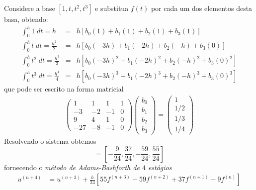 \begin{ex}
Considere a base $[1, t, t^2, t^3]$ e substitua $f(t)$ por cada um dos elementos desta basa, obtendo:
\begin{eqnarray}
  \int _0^{h} 1  \;dt = h             &=& h\left[ b_0(1)  +b_1(1)    + b_2(1)   + b_3(1)    \right]\\
  \int _0^{h} t  \;dt = \frac{h^2}{2}  &=& h\left[ b_0(-3h)  +b_1(-2h)   + b_2(-h) + b_3(0)  \right]\\
  \int _0^{h} t^2 \;dt = \frac{h^3}{3}  &=& h\left[b_0(-3h)^2 +b_1(-2h)^2  + b_2(-h)^2+ b_3(0)^2 \right]\\
  \int _0^{h} t^3 \;dt = \frac{h^4}{4} &=& h\left[ b_0(-3h)^3 +b_1(-2h)^3  + b_2(-h)^3+ b_3(0)^3 \right]
\end{eqnarray}
que pode ser escrito na forma matricial
\begin{eqnarray}
\left(
  \begin{array}{cccc}
    1  &  1  &  1  &  1\\
    -3  &  -2  &  -1  &  0\\
    9  &  4  &  1  &  0\\
    -27  &  -8  & -1  &  0
  \end{array}
\right)
\left(\begin{array}{c}  b_0 \\ b_1\\ b_2\\b_3   \end{array}\right)
=
\left(\begin{array}{c}  1  \\ 1/2 \\ 1/3 \\ 1/4  \end{array}\right)
\end{eqnarray}
Resolvendo o sistema obtemos
\begin{equation} [b_0,b_1,b_2,b_3]=\left[-\frac{9}{24},\frac{37}{24},-\frac{59}{24},\frac{55}{24}\right] \end{equation}
fornecendo o \emph{método de Adams-Bashforth de $4$ estágios}
\begin{eqnarray}\label{AB4}
  u^{(n+4)}  &= u^{(n+3)}  + \frac{h}{24} [55 f^{(n+3)} -59f^{(n+2)} +37f^{(n+1)} -9f^{(n)}]
\end{eqnarray}
\end{ex}


